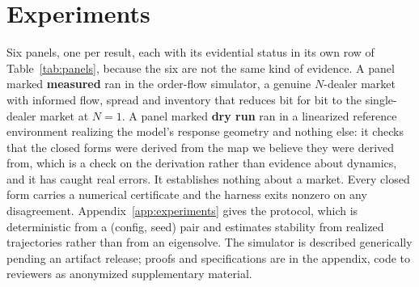 \documentclass{article}
\theoremstyle{plain}
\theoremstyle{definition}
\begin{document}
\section{Experiments}
\label{sec:experiments}

Six panels, one per result, each with its evidential status in its own row of Table~\ref{tab:panels}, because the six are not the same kind of evidence. A panel marked \textbf{measured} ran in the order-flow simulator, a genuine $N$-dealer market with informed flow, spread and inventory that reduces bit for bit to the single-dealer market at $N=1$. A panel marked \textbf{dry run} ran in a linearized reference environment realizing the model's response geometry and nothing else: it checks that the closed forms were derived from the map we believe they were derived from, which is a check on the derivation rather than evidence about dynamics, and it has caught real errors. It establishes nothing about a market. Every closed form carries a numerical certificate and the harness exits nonzero on any disagreement. Appendix~\ref{app:experiments} gives the protocol, which is deterministic from a (config, seed) pair and estimates stability from realized trajectories rather than from an eigensolve. The simulator is described generically pending an artifact release; proofs and specifications are in the appendix, code to reviewers as anonymized supplementary material.
\end{document}

